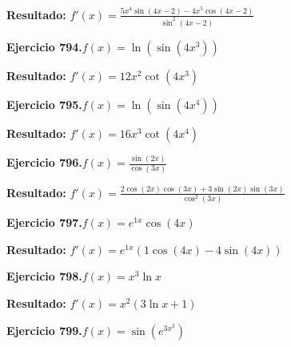 \documentclass[10pt,a4paper]{article}
\begin{document}
\begin{solbox}
\textbf{Resultado:} \(\displaystyle f'(x) = \frac{5x^{4}\sin(4x -2) - 4x^{5}\cos(4x -2)}{\sin^2(4x -2)}\)
\end{solbox}

\begin{ejbox}
\textbf{Ejercicio 794.}\quad $f(x) = \ln(\sin(4x^{3}))$
\end{ejbox}

\begin{solbox}
\textbf{Resultado:} \(\displaystyle f'(x) = 12x^{2}\cot(4x^{3})\)
\end{solbox}

\begin{ejbox}
\textbf{Ejercicio 795.}\quad $f(x) = \ln(\sin(4x^{4}))$
\end{ejbox}

\begin{solbox}
\textbf{Resultado:} \(\displaystyle f'(x) = 16x^{3}\cot(4x^{4})\)
\end{solbox}

\newpage
\begin{ejbox}
\textbf{Ejercicio 796.}\quad $f(x) = \frac{\sin(2x)}{\cos(3x)}$
\end{ejbox}

\begin{solbox}
\textbf{Resultado:} \(\displaystyle f'(x) = \frac{2\cos(2x)\cos(3x) + 3\sin(2x)\sin(3x)}{\cos^2(3x)}\)
\end{solbox}

\begin{ejbox}
\textbf{Ejercicio 797.}\quad $f(x) = e^{1x} \cos(4x)$
\end{ejbox}

\begin{solbox}
\textbf{Resultado:} \(\displaystyle f'(x) = e^{1x}(1\cos(4x) - 4\sin(4x))\)
\end{solbox}

\begin{ejbox}
\textbf{Ejercicio 798.}\quad $f(x) = x^{3} \ln x$
\end{ejbox}

\begin{solbox}
\textbf{Resultado:} \(\displaystyle f'(x) = x^{2}(3\ln x + 1)\)
\end{solbox}

\newpage
\begin{ejbox}
\textbf{Ejercicio 799.}\quad $f(x) = \sin(e^{3x^{3}})$
\end{ejbox}
\end{document}
